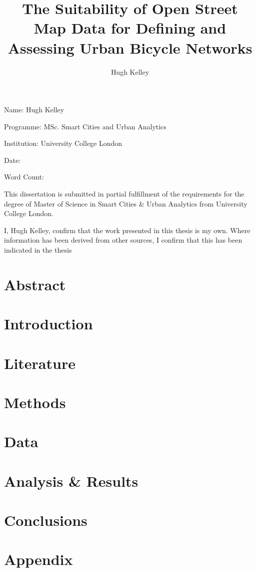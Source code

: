 \documentclass[hidelinks,11pt]{article} %
\title{The Suitability of Open Street Map Data for Defining and Assessing Urban Bicycle Networks}
\author{Hugh Kelley}
\begin{document}
\maketitle

\pagebreak


Name: Hugh Kelley

Programme: MSc. Smart Cities and Urban Analytics

Institution: University College London

Date:

Word Count:

This dissertation is submitted in partial fulfillment of the requirements for the degree of Master of Science in Smart Cities \& Urban Analytics from University College London.

I, Hugh Kelley, confirm that the work presented in this thesis is my own. Where information has been derived from other sources, I confirm that this has been indicated in the thesis
\pagebreak

\section{Abstract}


\pagebreak

\tableofcontents
\pagebreak

\listoffigures
\pagebreak

\listoftables
\pagebreak

\section{Introduction}

	

\section{Literature}

	

\section{Methods}

	


\section{Data}

	

\section{Analysis \& Results}

	


\section{Conclusions}

	


\pagebreak
\section{Appendix}


\pagebreak

\printbibliography
\end{document}
